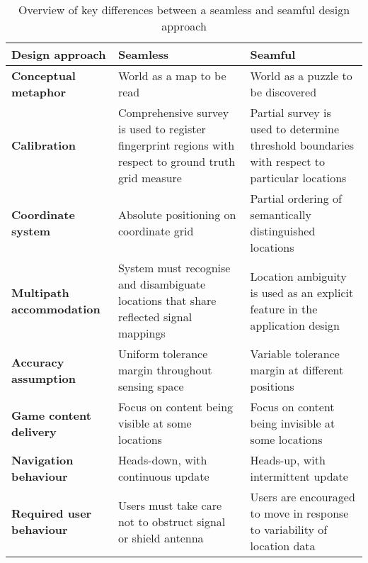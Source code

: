 \documentclass[prodmode,acmtomm]{acmsmall}
\begin{document}
\begin{table}[h]
\setlength\extrarowheight{5pt}
\begin{center}
\begin{tabular}{|p{4.2cm} | p{4.2cm}  | p{4.2cm} |}
\hline 
\textbf{Design approach} & \textbf{Seamless} & \textbf{Seamful} \\ \hline \hline 

\textbf{Conceptual metaphor} & World as a map to be read & World as a puzzle to be discovered \\ \hline

\textbf{Calibration} & Comprehensive survey is used to register fingerprint regions with respect to ground truth grid measure & Partial survey is used to determine threshold boundaries with respect to particular locations \\ \hline 

\textbf{Coordinate system} & Absolute positioning on coordinate grid &Partial ordering of semantically distinguished locations
 \\ \hline 
 
\textbf{Multipath accommodation} & System must recognise and disambiguate locations that share reflected signal mappings & Location ambiguity is used as an explicit feature in the application design \\ \hline 
 
\textbf{Accuracy assumption} & Uniform tolerance margin throughout sensing space & Variable tolerance margin at different positions\\ \hline 

\textbf{Game content delivery} & Focus on content being visible at some locations & Focus on content being invisible at some locations \\ \hline 

\textbf{Navigation behaviour} & Heads-down, with continuous update & Heads-up, with intermittent update
\\ \hline 

\textbf{Required user behaviour} & Users must take care not to obstruct signal or shield antenna &  Users are encouraged to move in response to variability of location data \\ \hline 

\end{tabular}
\label{seamless_seamful}
\textcolor{black}{
\caption{Overview of  key differences between a seamless and seamful design approach}
}
\end{center}
\end{table}
\end{document}
